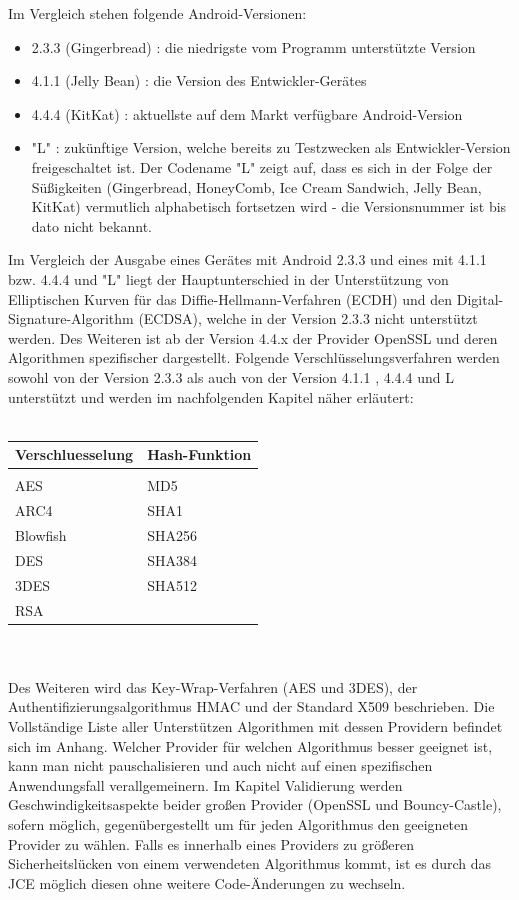\documentclass[10pt, a4paper]{scrreprt}
\begin{document}
Im Vergleich stehen folgende Android-Versionen:
\begin{itemize}
\item 2.3.3 (Gingerbread) : die niedrigste vom Programm unterstützte Version
\item 4.1.1 (Jelly Bean) : die Version des Entwickler-Gerätes
\item 4.4.4 (KitKat) : aktuellste auf dem Markt verfügbare Android-Version
\item "L" : zukünftige Version, welche bereits zu Testzwecken als Entwickler-Version freigeschaltet ist. Der Codename "L" zeigt auf, dass es sich in der Folge der Süßigkeiten (Gingerbread, HoneyComb, Ice Cream Sandwich, Jelly Bean, KitKat) vermutlich alphabetisch fortsetzen wird - die Versionsnummer ist bis dato nicht bekannt.
\end{itemize}
Im Vergleich der Ausgabe eines Gerätes mit Android 2.3.3 und eines mit 4.1.1 bzw. 4.4.4 und "L" liegt der Hauptunterschied in der Unterstützung von Elliptischen Kurven für das Diffie-Hellmann-Verfahren (ECDH) und den Digital-Signature-Algorithm (ECDSA), welche in der Version 2.3.3 nicht unterstützt werden. Des Weiteren ist ab der Version 4.4.x der Provider OpenSSL und deren Algorithmen spezifischer dargestellt.
Folgende Verschlüsselungsverfahren werden sowohl von der Version 2.3.3 als auch von der Version 4.1.1 , 4.4.4 und L unterstützt und werden im nachfolgenden Kapitel näher erläutert: \\ \\
\begin{tabular}{|l|l|} \hline\hline
\textbf{Verschluesselung} & \textbf{Hash-Funktion} \\ \hline &  \\
AES & MD5 \\
ARC4 & SHA1 \\
Blowfish & SHA256 \\
DES & SHA384 \\
3DES & SHA512 \\
RSA & \\
\hline\hline
\end{tabular} \\
\\Des Weiteren wird das Key-Wrap-Verfahren (AES und 3DES), der Authentifizierungsalgorithmus HMAC und der Standard X509 beschrieben. Die Vollständige Liste aller Unterstützen Algorithmen mit dessen Providern befindet sich im Anhang. Welcher Provider für welchen Algorithmus besser geeignet ist, kann man nicht pauschalisieren und auch nicht auf einen spezifischen Anwendungsfall verallgemeinern. Im Kapitel Validierung werden Geschwindigkeitsaspekte beider großen Provider (OpenSSL und Bouncy-Castle), sofern möglich, gegenübergestellt um für jeden Algorithmus den geeigneten Provider zu wählen. Falls es innerhalb eines Providers zu größeren Sicherheitslücken von einem verwendeten Algorithmus kommt, ist es durch das JCE möglich diesen ohne weitere Code-Änderungen zu wechseln. 
\end{document}
